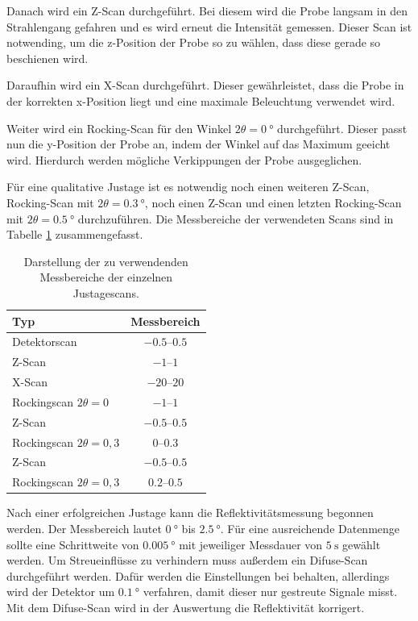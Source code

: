 Danach wird ein Z-Scan durchgeführt. Bei diesem wird die Probe langsam in den Strahlengang gefahren und es wird erneut die Intensität gemessen. Dieser Scan ist notwending, um die 
z-Position der Probe so zu wählen, dass diese gerade so beschienen wird.

Daraufhin wird ein X-Scan durchgeführt. Dieser gewährleistet, dass die Probe in der korrekten x-Position liegt und eine maximale Beleuchtung verwendet wird. 

Weiter wird ein Rocking-Scan für den Winkel $2\theta = \qty{0}{\degree}$ durchgeführt. Dieser passt nun die y-Position der Probe an, indem der Winkel auf das Maximum geeicht wird. 
Hierdurch werden mögliche Verkippungen der Probe ausgeglichen.

Für eine qualitative Justage ist es notwendig noch einen weiteren Z-Scan, Rocking-Scan mit $2\theta = \qty{0.3}{\degree}$, noch einen Z-Scan und einen letzten Rocking-Scan mit 
$2\theta = \qty{0.5}{\degree}$ durchzuführen. Die Messbereiche der verwendeten Scans sind in Tabelle \ref{tab:Messbereiche} zusammengefasst.

\begin{table}
    \centering
    \caption{Darstellung der zu verwendenden Messbereiche der einzelnen Justagescans.}
    \label{tab:Messbereiche}
    \begin{tabular}{l c}
      \toprule
      {Typ} & {Messbereich} \\
      \midrule
      {Detektorscan}                & {$\numrange{-0,5}{0,5}$}  \\
      {Z-Scan}                      & {$\numrange{-1}{1}$}      \\
      {X-Scan}                      & {$\numrange{-20}{20}$}    \\
      {Rockingscan $2\theta=0$}     & {$\numrange{-1}{1}$}      \\
      {Z-Scan}                      & {$\numrange{-0,5}{0,5}$}  \\
      {Rockingscan $2\theta=0,3$}   & {$\numrange{0}{0,3}$}     \\
      {Z-Scan}                      & {$\numrange{-0,5}{0,5}$}  \\
      {Rockingscan $2\theta=0,3$}   & {$\numrange{0,2}{0,5}$}   \\
      \bottomrule
    \end{tabular}
\end{table}

Nach einer erfolgreichen Justage kann die Reflektivitätsmessung begonnen werden. Der Messbereich lautet $\qty{0}{\degree}$ bis $\qty{2.5}{\degree}$. Für eine ausreichende 
Datenmenge sollte eine Schrittweite von $\qty{0.005}{\degree}$ mit jeweiliger Messdauer von $\qty{5}{\second}$ gewählt werden. Um Streueinflüsse zu verhindern muss außerdem ein 
Difuse-Scan durchgeführt werden. Dafür werden die Einstellungen bei behalten, allerdings wird der Detektor um $\qty{0.1}{\degree}$ verfahren, damit dieser nur gestreute Signale 
misst. Mit dem Difuse-Scan wird in der Auswertung die Reflektivität korrigert.